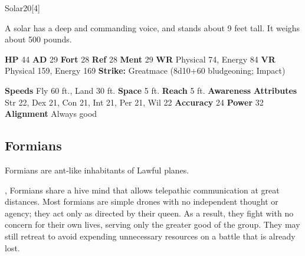   \begin{monsubsection}{Solar}{20}[4]
    \vspace{-1em}\vspace{-1em}
    \vspace{0em}

    
          A solar has a deep and commanding voice, and stands about 9 feet tall. It weighs about 500 pounds.
        

    \begin{spellcontent}
      \begin{spelltargetinginfo}
        \pari \textbf{HP} 44 \monsep
          \textbf{AD} 29 \monsep
          \textbf{Fort} 28 \monsep
          \textbf{Ref} 28 \monsep
          \textbf{Ment} 29
        \pari \textbf{WR} Physical 74, Energy 84 \monsep
        \textbf{VR} Physical 159, Energy 169
        \pari \textbf{Strike:}
            Greatmace  (8d10+60 bludgeoning; Impact)
      \end{spelltargetinginfo}
    \end{spellcontent}
    \begin{monsterfooter}
      \pari \textbf{Speeds} Fly 60 ft., Land 30 ft. \monsep
        \textbf{Space} 5 ft. \monsep
        \textbf{Reach} 5 ft.
      \pari \textbf{Awareness} 
      \pari \textbf{Attributes}
        Str 22, Dex 21,
        Con 21, Int 21,
        Per 21, Wil 22
      \pari \textbf{Accuracy} 24 \monsep
        \textbf{Power} 32
      \pari \textbf{Alignment} Always good
    \end{monsterfooter}
  \end{monsubsection}
  
  
  
    \subsection{Formians}
      
      Formians are ant-like inhabitants of Lawful planes.
    
 ,
      Formians share a hive mind that allows telepathic communication at great distances.
      Most formians are simple drones with no independent thought or agency; they act only as directed by their queen.
      As a result, they fight with no concern for their own lives, serving only the greater good of the group.
      They may still retreat to avoid expending unnecessary resources on a battle that is already lost.
    
